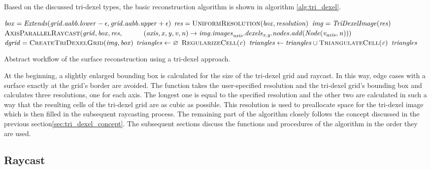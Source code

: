 Based on the discussed tri-dexel types, the basic reconstruction algorithm is shown in algorithm \ref{alg:tri_dexel}.
%
\begin{algorithm}
	\centering
	\begin{algorithmic}[1]
			\State $\mathit{box} = \mathit{Extends}(\mathit{grid}.\mathit{aabb}.\mathit{lower} - \epsilon, \mathit{grid}.\mathit{aabb}.\mathit{upper} + \epsilon)$
			\State $\var{res} = \Call{UniformResolution}{\var{box}, \var{resolution}}$
			\State $\mathit{img} = \mathit{TriDexelImage}(\mathit{res})$
			\State $\Call{AxisParallelRaycast}{\var{grid}, \var{box}, \var{res},\hfill\break
				\hspace*{\dimexpr\algorithmicindent*2}(\var{axis}, \var{x}, \var{y}, \var{v}, \var{n}) \rightarrow \var{img}.\var{images}_{\var{axis}}.\var{dexels}_{\var{x}, \var{y}}.\var{nodes}.\var{add}(\var{Node}(\var{v}_{\var{axis}}, \var{n}))}$
			\State $\var{dgrid} = \Call{CreateTriDexelGrid}{\var{img}, \var{box}}$
			\State $\mathit{triangles} \gets \varnothing$
				\State $\Call{RegularizeCell}{\var{c}}$
				\State $\var{triangles} \gets \var{triangles} \cup \Call{TriangulateCell}{\var{c}}$
			\EndFor
			\State \Return $\mathit{triangles}$
		\EndFunction
	\end{algorithmic}
	\caption{
		Abstract workflow of the surface reconstruction using a tri-dexel approach.
	}
	\label{alg:tri_dexel}
\end{algorithm}
%
At the beginning, a slightly enlarged bounding box is calculated for the size of the tri-dexel grid and raycast.
In this way, edge cases with a surface exactly at the grid's border are avoided.
The  function takes the user-specified resolution and the tri-dexel grid's bounding box and calculates three resolutions, one for each axis.
The longest one is equal to the specified resolution and the other two are calculated in such a way that the resulting cells of the tri-dexel grid are as cubic as possible.
This resolution is used to preallocate space for the tri-dexel image which is then filled in the subsequent raycasting process.
The remaining part of the algorithm closely follows the concept discussed in the previous section\ref{sec:tri_dexel_concept}.
The subsequent sections discuss the functions and procedures of the algorithm in the order they are used.


\subsection{Raycast}
\label{sec:tri_dexel_raycast}


